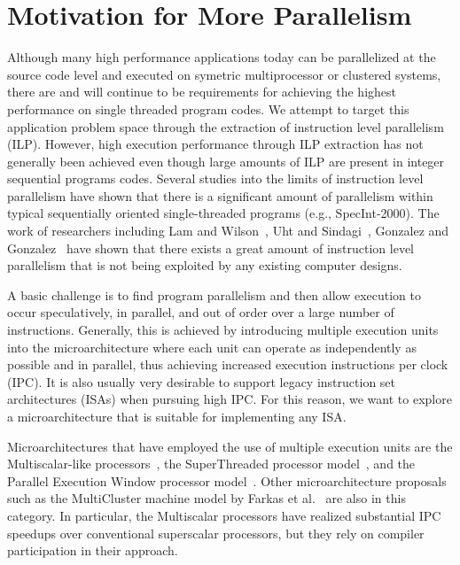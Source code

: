 \documentclass{book}
\begin{document}
\section{Motivation for More Parallelism}
%
Although many high performance applications today
can be parallelized at the source code level 
and executed on symetric multiprocessor or clustered systems,
there are and will continue
to be requirements for achieving the highest performance
on single threaded program codes.
We attempt to target this application problem space
through the extraction of instruction level parallelism (ILP).
However, 
high execution performance through ILP
extraction has not generally been achieved even though
large amounts of ILP are present in integer sequential programs
codes.
Several studies into the limits of instruction level 
parallelism have shown that there is 
a significant amount of parallelism within
typical sequentially oriented single-threaded programs
(e.g., SpecInt-2000).  
The work of researchers including 
Lam and Wilson~\cite{Lam92},
Uht and Sindagi~\cite{Uht95},
Gonzalez and Gonzalez~\cite{Gon97}
have shown that there exists a great amount of instruction level
parallelism that is not being exploited by any existing
computer designs.

A basic challenge 
is to find program parallelism and then allow execution to occur
speculatively, in parallel, and out of order over 
a large number of instructions.
Generally, this is achieved by introducing multiple
execution units into the microarchitecture where each unit
can operate as independently as possible and in parallel, thus
achieving increased execution instructions per clock (IPC).
It is also usually very desirable to support legacy instruction
set architectures (ISAs) when pursuing high IPC. 
For this reason, we want to explore a
microarchitecture that is suitable for implementing any ISA.

Microarchitectures that have employed the
use of multiple execution units are the Multiscalar-like
processors~\cite{Sohi95,sundararaman97multiscalar},
the SuperThreaded processor model~\cite{tsai96superthread},
and
the Parallel Execution Window processor model~\cite{kemp96pew}.
Other microarchitecture proposals such as the MultiCluster machine
model by 
Farkas et al.~\cite{farkas97multicluster} are also in this category.
In particular, the Multiscalar processors have
realized substantial IPC speedups over conventional superscalar
processors, but they rely on compiler participation in their
approach.
\end{document}
